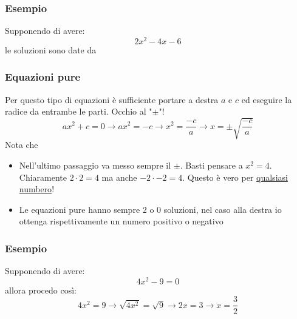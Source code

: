 \subsubsection*{Esempio}
Supponendo di avere:
\[
	2x^2  - 4x - 6
\]
le soluzioni sono date da
\begin{center}
\end{center}

\subsubsection{Equazioni pure}
Per questo tipo di equazioni è sufficiente portare a destra $ a $ e $ c $ ed eseguire la radice da entrambe le parti. Occhio al "$ \pm $"!
\[
	ax^2 + c  = 0 \rightarrow ax^2  = -c \rightarrow x^2  = \frac{-c}{a} \rightarrow x = \pm \sqrt{\frac{-c}{a}}
\]
Nota che
\begin{itemize}
	\item Nell'ultimo passaggio va messo sempre il $ \pm $. Basti pensare a $ x^2  = 4 $. Chiaramente $ 2 \cdot 2 = 4 $ ma anche $ -2 \cdot  -2  = 4$. Questo è vero per \underline{qualsiasi numbero}!
	\item Le equazioni pure hanno sempre 2 o 0 soluzioni, nel caso alla destra io ottenga rispettivamente un numero positivo o negativo
\end{itemize}
\subsubsection*{Esempio}
Supponendo di avere:
\[
	4x^2 -9 = 0
\]
allora procedo così:
\[
	4x^2 = 9 \rightarrow \sqrt{4x^2 } = \sqrt{9} \rightarrow 2x = 3 \rightarrow x = \frac{3}{2}
\]

